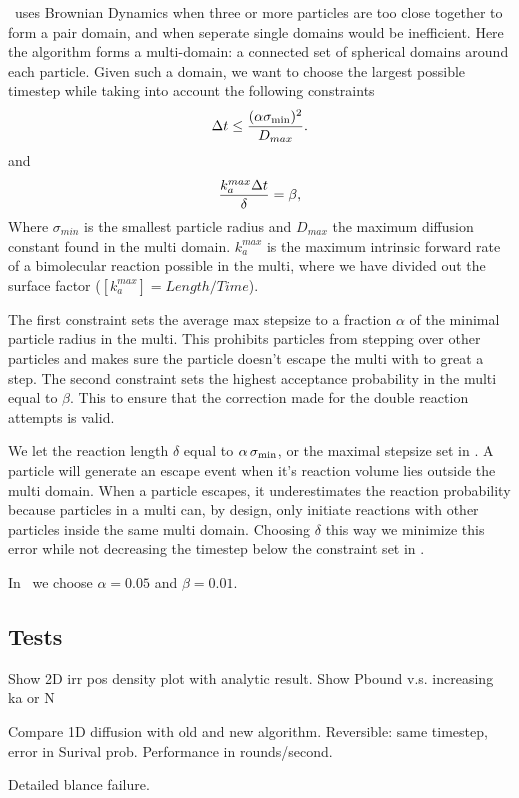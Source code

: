 \GFRD\, uses Brownian Dynamics when three or more particles are too close together to form a pair domain, and when seperate single domains would be inefficient. Here the algorithm forms a multi-domain: a connected set of spherical domains around each particle. Given such a domain, we want to choose the largest possible timestep while taking into account the following constraints
\begin{equation}
 \Delta t \leq \frac{(\alpha \sigma_{\rm min})^2 }{D_{max}}.
 \elabel{BDcntrI}
\end{equation}
and
\begin{equation}
 \frac{k_{a}^{max} \Delta t}{\delta} = \beta,
 \elabel{BDcntrII}
\end{equation}
Where $\sigma_{min}$ is the smallest particle radius and $D_{max}$ the maximum diffusion constant found in the multi domain. $k_{a}^{max}$ is the maximum intrinsic forward rate of a bimolecular reaction possible in the multi, where we have divided out the surface factor ($[k_{a}^{max}] = Length/Time $).

The first constraint sets the average max stepsize to a fraction $\alpha$ of the minimal particle radius in the multi. This prohibits particles from stepping over other particles and makes sure the particle doesn't escape the multi with to great a step. The second constraint sets the highest acceptance probability in the multi equal to $\beta$. This to ensure that the correction made for the double reaction attempts is valid. 

We let the reaction length $\delta$ equal to $\alpha \, \sigma_{\rm min}$, or the maximal stepsize set in . A particle will generate an escape event when it's reaction volume lies outside the multi domain. When a particle escapes, it underestimates the reaction probability because particles in a multi can, by design, only initiate reactions with other particles inside the same multi domain. Choosing $\delta$ this way we minimize this error while not decreasing the timestep below the constraint set in .

In \GFRD\, we choose $\alpha = 0.05$ and $\beta = 0.01$.

\subsection{Tests}
Show 2D irr pos density plot with analytic result.
Show Pbound v.s. increasing ka or N

Compare 1D diffusion with old and new algorithm. Reversible: same timestep, error in Surival prob. Performance in rounds/second.

Detailed blance failure.